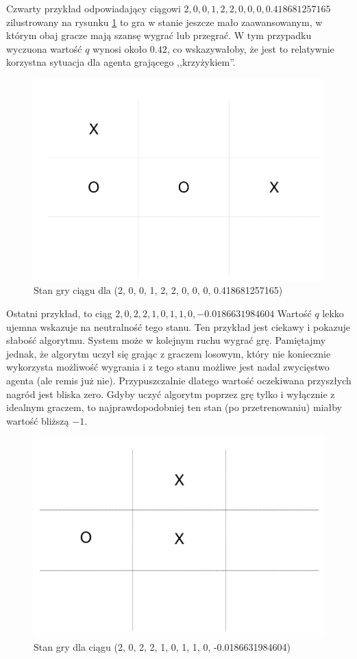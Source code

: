 \documentclass[licencjacka]{pracamgr}
\begin{document}
Czwarty przykład odpowiadający ciągowi $2, 0, 0, 1, 2, 2, 0, 0, 0, 0.418681257165$  zilustrowany na rysunku \ref{Rys12} to gra w stanie jeszcze mało zaawansowanym, w którym obaj gracze mają szansę wygrać lub przegrać. W tym przypadku wyczuona wartość $q$ wynosi około $0.42$, co wskazywałoby, że jest to relatywnie korzystna sytuacja dla agenta grającego ,,krzyżykiem''.

\begin{figure}[h!]
	\includegraphics [scale=0.22] {ttt_4.png}
	\caption{Stan gry ciągu dla (2, 0, 0, 1, 2, 2, 0, 0, 0, 0.418681257165)}
	\label{Rys12}
\end{figure}


Ostatni przykład, to ciąg $ 2, 0, 2, 2, 1, 0, 1, 1, 0, -0.0186631984604$ Wartość $q$ lekko ujemna wskazuje na neutralność tego stanu. Ten przykład jest ciekawy i pokazuje słabość algorytmu. System może w kolejnym ruchu wygrać grę. Pamiętajmy jednak, że algorytm uczył się grając z graczem losowym, który nie koniecznie wykorzysta możliwość wygrania i z tego stanu możliwe jest nadal zwycięstwo agenta (ale remis już nie). Przypuszczalnie dlatego wartość oczekiwana przyszłych nagród jest bliska zero. Gdyby uczyć algorytm poprzez grę tylko i wyłącznie z idealnym graczem, to najprawdopodobniej ten stan (po przetrenowaniu) miałby wartość bliższą $-1$.
\begin{figure}[h!]
	\includegraphics [scale=0.22] {ttt_5.png}
	\caption{Stan gry dla ciągu (2, 0, 2, 2, 1, 0, 1, 1, 0, -0.0186631984604) }
	\label{Rys13}
\end{figure}
\end{document}
